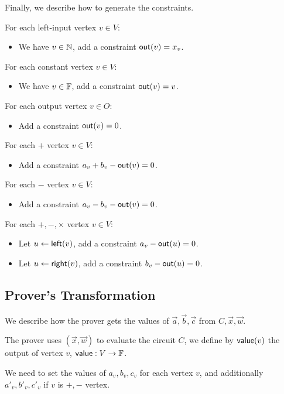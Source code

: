 Finally, we describe how to generate the constraints.

For each left-input vertex $v \in V$:
\begin{itemize}
    \item We have $v \in \mathbb{N}$, add a constraint $\mathsf{out}(v) = x_v$.
\end{itemize}

For each constant vertex $v \in V$:
\begin{itemize}
    \item We have $v \in \mathbb{F}$, add a constraint $\mathsf{out}(v) = v$.
\end{itemize}

For each output vertex $v \in O$:
\begin{itemize}
    \item Add a constraint $\mathsf{out}(v) = 0$.
\end{itemize}

For each $+$ vertex $v \in V$:
\begin{itemize}
    \item Add a constraint $a_v + b_v - \mathsf{out}(v) = 0$.
\end{itemize}

For each $-$ vertex $v \in V$:
\begin{itemize}
    \item Add a constraint $a_v - b_v - \mathsf{out}(v) = 0$.
\end{itemize}

For each $+, -, \times$ vertex $v \in V$:
\begin{itemize}
    \item Let $u \gets \mathsf{left}(v)$, add a constraint $a_v - \mathsf{out}(u) = 0$.
    \item Let $u \gets \mathsf{right}(v)$, add a constraint $b_v - \mathsf{out}(u) = 0$.
\end{itemize}

\subsection{Prover's Transformation}

We describe how the prover gets the values of $\Vec{a}, \Vec{b}, \Vec{c}$ from $C, \Vec{x}, \Vec{w}$.

The prover uses $(\Vec{x}, \Vec{w})$ to evaluate the circuit $C$, we define by $\mathsf{value}(v)$ the output of vertex $v$, $\mathsf{value}: V \to \mathbb{F}$.

We need to set the values of $a_v, b_v, c_v$ for each vertex $v$, and additionally $a'_v, b'_v, c'_v$ if $v$ is $+, -$ vertex.

